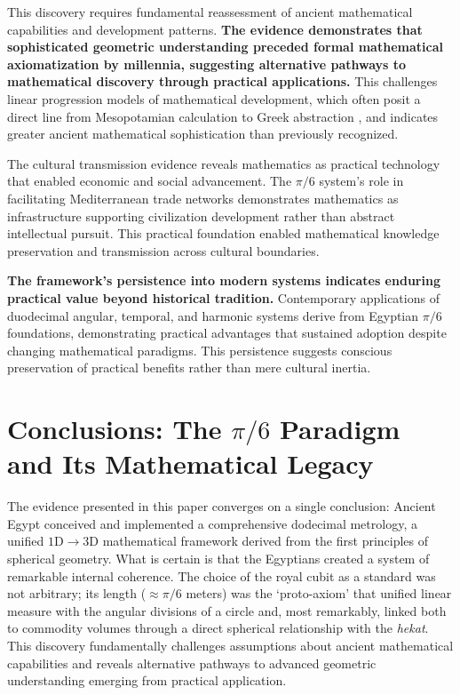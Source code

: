 \documentclass[11pt]{article}
\begin{document}
This discovery requires fundamental reassessment of ancient mathematical capabilities and development patterns. \textbf{The evidence demonstrates that sophisticated geometric understanding preceded formal mathematical axiomatization by millennia, suggesting alternative pathways to mathematical discovery through practical applications.} This challenges linear progression models of mathematical development, which often posit a direct line from Mesopotamian calculation to Greek abstraction \cite{neugebauer1969exact}, and indicates greater ancient mathematical sophistication than previously recognized.

The cultural transmission evidence reveals mathematics as practical technology that enabled economic and social advancement. The $\pi/6$ system's role in facilitating Mediterranean trade networks demonstrates mathematics as infrastructure supporting civilization development rather than abstract intellectual pursuit. This practical foundation enabled mathematical knowledge preservation and transmission across cultural boundaries.

\textbf{The framework's persistence into modern systems indicates enduring practical value beyond historical tradition.} Contemporary applications of duodecimal angular, temporal, and harmonic systems derive from Egyptian $\pi/6$ foundations, demonstrating practical advantages that sustained adoption despite changing mathematical paradigms. This persistence suggests conscious preservation of practical benefits rather than mere cultural inertia.

\section{Conclusions: The \texorpdfstring{$\pi/6$}{pi/6} Paradigm and Its Mathematical Legacy}

The evidence presented in this paper converges on a single conclusion: Ancient Egypt conceived and implemented a comprehensive dodecimal metrology, a unified $1\text{D} \to 3\text{D}$ mathematical framework derived from the first principles of spherical geometry. What is certain is that the Egyptians created a system of remarkable internal coherence. The choice of the royal cubit as a standard was not arbitrary; its length ($\approx\pi/6$ meters) was the `proto-axiom' that unified linear measure with the angular divisions of a circle and, most remarkably, linked both to commodity volumes through a direct spherical relationship with the \textit{hekat}. This discovery fundamentally challenges assumptions about ancient mathematical capabilities and reveals alternative pathways to advanced geometric understanding emerging from practical application.
\end{document}
